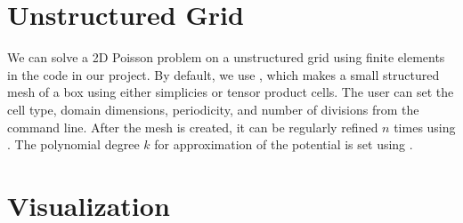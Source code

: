 \section{Unstructured Grid}

We can solve a 2D Poisson problem on a unstructured grid using finite elements in the  code in our project. By default, we use , which makes a small structured mesh of a box using either simplicies or tensor product cells. The user can set the cell type, domain dimensions, periodicity, and number of divisions from the command line. After the mesh is created, it can be regularly refined $n$ times using . The polynomial degree $k$ for approximation of the potential is set using .

\section{Visualization}

